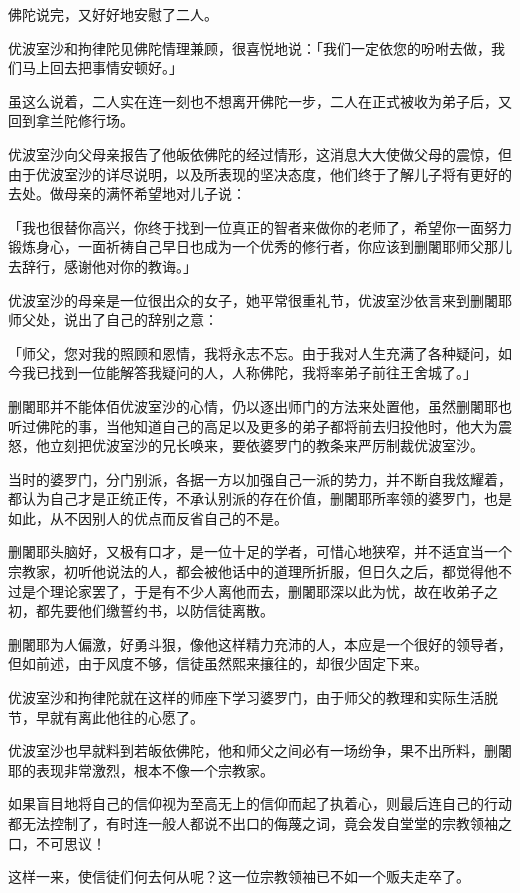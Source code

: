 \documentclass[12pt,twoside,openany]{book}
\begin{document}
佛陀说完，又好好地安慰了二人。

优波室沙和拘律陀见佛陀情理兼顾，很喜悦地说：「我们一定依您的吩咐去做，我们马上回去把事情安顿好。」

虽这么说着，二人实在连一刻也不想离开佛陀一步，二人在正式被收为弟子后，又回到拿兰陀修行场。

优波室沙向父母亲报告了他皈依佛陀的经过情形，这消息大大使做父母的震惊，但由于优波室沙的详尽说明，以及所表现的坚决态度，他们终于了解儿子将有更好的去处。做母亲的满怀希望地对儿子说：

「我也很替你高兴，你终于找到一位真正的智者来做你的老师了，希望你一面努力锻炼身心，一面祈祷自己早日也成为一个优秀的修行者，你应该到删闍耶师父那儿去辞行，感谢他对你的教诲。」

优波室沙的母亲是一位很出众的女子，她平常很重礼节，优波室沙依言来到删闍耶师父处，说出了自己的辞别之意：

「师父，您对我的照顾和恩情，我将永志不忘。由于我对人生充满了各种疑问，如今我已找到一位能解答我疑问的人，人称佛陀，我将率弟子前往王舍城了。」

删闍耶并不能体佰优波室沙的心情，仍以逐出师门的方法来处置他，虽然删闍耶也听过佛陀的事，当他知道自己的高足以及更多的弟子都将前去归投他时，他大为震怒，他立刻把优波室沙的兄长唤来，要依婆罗门的教条来严厉制裁优波室沙。

当时的婆罗门，分门别派，各据一方以加强自己一派的势力，并不断自我炫耀着，都认为自己才是正统正传，不承认别派的存在价值，删闍耶所率领的婆罗门，也是如此，从不因别人的优点而反省自己的不是。

删闍耶头脑好，又极有口才，是一位十足的学者，可惜心地狭窄，并不适宜当一个宗教家，初听他说法的人，都会被他话中的道理所折服，但日久之后，都觉得他不过是个理论家罢了，于是有不少人离他而去，删闍耶深以此为忧，故在收弟子之初，都先要他们缴誓约书，以防信徒离散。

删闍耶为人偏激，好勇斗狠，像他这样精力充沛的人，本应是一个很好的领导者，但如前述，由于风度不够，信徒虽然熙来攘往的，却很少固定下来。

优波室沙和拘律陀就在这样的师座下学习婆罗门，由于师父的教理和实际生活脱节，早就有离此他往的心愿了。

优波室沙也早就料到若皈依佛陀，他和师父之间必有一场纷争，果不出所料，删闍耶的表现非常激烈，根本不像一个宗教家。

如果盲目地将自己的信仰视为至高无上的信仰而起了执着心，则最后连自己的行动都无法控制了，有时连一般人都说不出口的侮蔑之词，竟会发自堂堂的宗教领袖之口，不可思议！

这样一来，使信徒们何去何从呢？这一位宗教领袖已不如一个贩夫走卒了。
\end{document}
